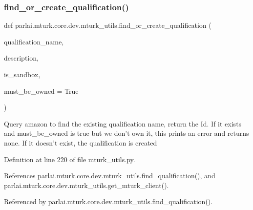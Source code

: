 \subsubsection{\texorpdfstring{find\+\_\+or\+\_\+create\+\_\+qualification()}{find\_or\_create\_qualification()}}
{\footnotesize\ttfamily def parlai.\+mturk.\+core.\+dev.\+mturk\+\_\+utils.\+find\+\_\+or\+\_\+create\+\_\+qualification (\begin{DoxyParamCaption}\item[{}]{qualification\+\_\+name,  }\item[{}]{description,  }\item[{}]{is\+\_\+sandbox,  }\item[{}]{must\+\_\+be\+\_\+owned = {\ttfamily True} }\end{DoxyParamCaption})}

\begin{DoxyVerb}Query amazon to find the existing qualification name, return the Id. If
it exists and must_be_owned is true but we don't own it, this prints an
error and returns none. If it doesn't exist, the qualification is created
\end{DoxyVerb}
 

Definition at line 220 of file mturk\+\_\+utils.\+py.



References parlai.\+mturk.\+core.\+dev.\+mturk\+\_\+utils.\+find\+\_\+qualification(), and parlai.\+mturk.\+core.\+dev.\+mturk\+\_\+utils.\+get\+\_\+mturk\+\_\+client().



Referenced by parlai.\+mturk.\+core.\+dev.\+mturk\+\_\+utils.\+find\+\_\+qualification().

